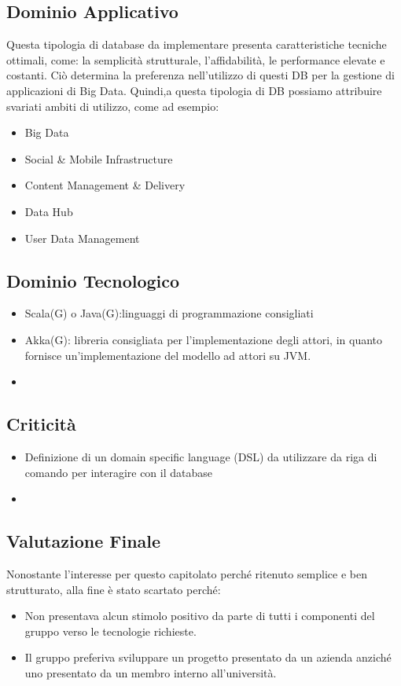 \subsection{Dominio Applicativo}
Questa tipologia di database da implementare presenta caratteristiche tecniche ottimali, come: la semplicità strutturale, l'affidabilità, le performance elevate e costanti.
Ciò determina la preferenza nell'utilizzo di questi DB per la gestione di applicazioni di Big Data.
Quindi,a questa tipologia di DB possiamo attribuire svariati ambiti di utilizzo, come ad esempio:
\begin{itemize}
\item
Big Data 
\item
Social & Mobile Infrastructure
\item
Content Management & Delivery
\item
Data Hub
\item
User Data Management 
\end{itemize}

\subsection{Dominio Tecnologico}
\begin{itemize}
\item
Scala(G) o Java(G):linguaggi di programmazione consigliati
\item
Akka(G): libreria consigliata per l'implementazione degli attori, in quanto fornisce un'implementazione del modello ad attori su JVM.
\item
\end{itemize}

\subsection{Criticità}
\begin{itemize}
\item
Definizione di un domain specific language (DSL) da utilizzare da riga di comando per interagire con il database
\item
\end{itemize}

\subsection{Valutazione Finale}
Nonostante l'interesse per questo capitolato perché ritenuto semplice e ben strutturato, alla fine è stato scartato perché:
\begin{itemize}
\item
Non presentava alcun stimolo positivo da parte di tutti i componenti del gruppo verso le tecnologie richieste.
\item
Il gruppo preferiva sviluppare un progetto presentato da un azienda anziché uno presentato da un membro interno all'università.
\end{itemize}